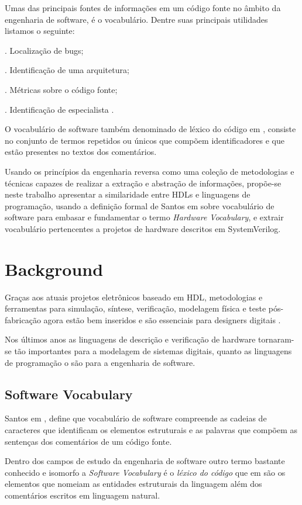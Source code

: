 \documentclass[12pt, twocolumn, a4paper]{article}
\begin{document}
Umas das principais fontes de informações em um código fonte no âmbito da engenharia de software, é o vocabulário. Dentre suas principais utilidades listamos o seguinte:

. Localização de bugs;

. Identificação de uma arquitetura;

. Métricas sobre o código fonte;

. Identificação de especialista \cite{Santos2015}.

O vocabulário de software também denominado de léxico do código em \cite{Biggers2011}, consiste no conjunto de termos repetidos ou únicos que compõem identificadores e que estão presentes no textos dos comentários\cite{Abebe2009}.

Usando os princípios da engenharia reversa como uma coleção de metodologias e técnicas capazes de realizar a extração e abstração de informações\cite{Santos2009}, propõe-se neste trabalho apresentar a similaridade entre HDLs e linguagens de programação, usando a definição formal de Santos em \cite{Santos2015} sobre vocabulário de software para embasar e fundamentar o termo \textit{Hardware Vocabulary}, e extrair vocabulário pertencentes a projetos de hardware descritos em SystemVerilog. 

	\section{Background}
\quad Graças aos atuais projetos eletrônicos baseado em HDL, metodologias e ferramentas para simulação, síntese, verificação, modelagem física e teste pós-fabricação agora estão bem inseridos e são essenciais para designers digitais \cite{Navabi2015}. 

Nos últimos anos as linguagens de descrição e verificação de hardware tornaram-se tão importantes para a modelagem de sistemas digitais, quanto as linguagens de programação o são para a engenharia de software. 
	
	\subsection{Software Vocabulary}
\quad Santos em \cite{Santos2009}, define que vocabulário de software compreende as cadeias de caracteres que identificam os elementos estruturais e as palavras que compõem as sentenças dos comentários de um código fonte. 

Dentro dos campos de estudo da engenharia de software outro termo bastante conhecido e isomorfo a \textit{Software Vocabulary} é o \textit{léxico do código} que em \cite{Biggers2011} são os elementos que nomeiam as entidades estruturais da linguagem além dos comentários escritos em linguagem natural.
\end{document}
